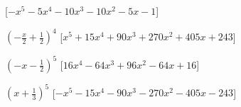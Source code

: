 \begin{esercizio}
\begin{enumeratea}
  \hfill [\(- x^{5} - 5 x^{4} - 10 x^{3} - 10 x^{2} - 5 x - 1\)]
\item \(\left(- \frac{x}{2} + \frac{1}{2}\right)^{4}\)
  \hfill [\(x^{5} + 15 x^{4} + 90 x^{3} + 270 x^{2} + 405 x + 243\)]
\item \(\left(- x - \frac{1}{2}\right)^{5}\)
  \hfill [\(16 x^{4} - 64 x^{3} + 96 x^{2} - 64 x + 16\)]
\item \(\left(x + \frac{1}{3}\right)^{5}\)
  \hfill [\(- x^{5} - 15 x^{4} - 90 x^{3} - 270 x^{2} - 405 x - 243\)]
\end{enumeratea}
\end{esercizio}

